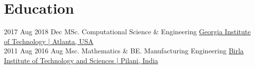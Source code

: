 \documentclass[letterpaper]{DS_class_file} %
\begin{document}
\section{Education}

\begin{twenty} %

   	\twentyitem
	    {2017 Aug}
	    {2018 Dec}
	    {\hspace{0.2cm}MSc. Computational Science \& Engineering}
	    {\href{https://www.gatech.edu/}{\textbf{} }}
	    {\hspace{0.2cm}\href{https://www.gatech.edu/}{Georgia Institute of Technology | Atlanta, USA} }
        \\
    \twentyitem
	    {2011 Aug}
	    {2016 Aug}
	    {\hspace{0.2cm}Msc. Mathematics \& BE. Manufacturing Engineering}
	    {\href{https://www.gatech.edu/}{\textbf{} }}
	    {\hspace{0.2cm}\href{https://www.bits-pilani.ac.in/}{Birla Institute of Technology and Sciences | Pilani, India} }
        \\
\end{twenty}


\end{document}
